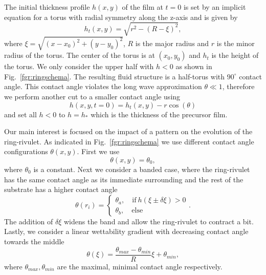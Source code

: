 \documentclass[twoside,twocolumn,9pt]{article}
\begin{document}
The initial thickness profile $h(x,y)$ of the film at $t=0$ is set by an implicit equation for a torus with radial symmetry along the z-axis and is given by
\begin{equation}\label{eq:torus}
    h_t(x,y) = \sqrt{r^2 - \left(R-\xi\right)^2},
\end{equation}
where $\xi = \sqrt{(x-x_0)^2+(y-y_0)^2}$, $R$ is the major radius and $r$ is the minor radius of the torus.
The center of the torus is at $(x_0,y_0)$ and $h_t$ is the height of the torus.
We only consider the upper half with $h<0$ as shown in Fig.~\ref{fgr:ringschema}. 
The resulting fluid structure is a half-torus with $90^{\circ}$ contact angle.
This contact angle violates the long wave approximation $\theta \ll 1$, therefore we perform another cut to a smaller contact angle using
\begin{equation}\label{eq:cut_torus}
    h(x,y,t=0) = h_t(x,y) - r\cos(\theta)
\end{equation}
and set all $h < 0$ to $h = h_{\ast}$ which is the thickness of the precursor film.

Our main interest is focused on the impact of a pattern on the evolution of the ring-rivulet. 
As indicated in Fig.~\ref{fgr:ringschema} we use different contact angle configurations $\theta(x,y)$.
First we use 
\begin{equation}\label{eq:theta_const}
    \theta(x,y) = \theta_0,
\end{equation}
where $\theta_0$ is a constant.
Next we consider a banded case, where the ring-rivulet has the same contact angle as its immediate surrounding and the rest of the substrate has a higher contact angle
\begin{equation}\label{eq:theta_band}
    \theta(r_i) =\begin{cases}
        \theta_a,\quad \text{if}~h(\xi\pm \delta\xi) > 0\\
        \theta_b,\quad \text{else}
    \end{cases}.
\end{equation}
The addition of $\delta\xi$ widens the band and allow the ring-rivulet to contract a bit.  
Lastly, we consider a linear wettability gradient with decreasing contact angle towards the middle
\begin{equation}\label{eq:theta_grad}
    \theta(\xi) = \frac{\theta_{max}-\theta_{min}}{R} \xi + \theta_{min},
\end{equation}
where $\theta_{max}, \theta_{min}$ are the maximal, minimal contact angle respectively.
\end{document}
